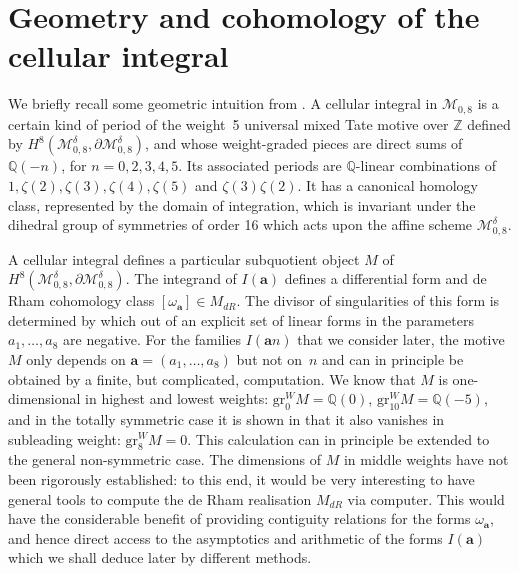 \documentclass[12pt,reqno]{amsart}
\theoremstyle{remark}
\newcommand\ba{\boldsymbol a}
\newcommand{\wadimnote}[1]{{\color{blue} Wadim: #1}}
\begin{document}
\section{Geometry and cohomology of the cellular integral}
\label{secgeom}
We briefly recall some geometric intuition from \cite{Br16}. A  cellular integral in $\mathcal{M}_{0,8}$ is a certain kind of period of the weight~5 universal mixed Tate motive over $\mathbb{Z}$ defined by   
$H^8( \mathcal{M}_{0,8}^{\delta}, \partial \mathcal{M}_{0,8}^{\delta} )$, and whose weight-graded pieces are direct sums of  $\mathbb{Q}(-n)$,
for $n=0,2,3,4,5$.  Its associated periods are $\mathbb{Q}$-linear combinations of $1,\zeta(2), \zeta(3), \zeta(4), \zeta(5)$ and $\zeta(3)\zeta(2)$. It has a canonical homology class, represented by the domain of integration,  which is invariant under the dihedral group of symmetries of order 16 which acts upon the affine scheme $\mathcal{M}_{0,8}^{\delta}. $

A cellular integral defines a particular subquotient  object $M$ of $ H^8( \mathcal{M}_{0,8}^{\delta}, \partial \mathcal{M}_{0,8}^{\delta} )$.
The integrand of $I(\ba)$ defines a   differential form  and de Rham cohomology class $[\omega_{\ba}] \in M_{dR}$. The divisor of singularities of this form is determined by which out of an  explicit set of  linear forms in the parameters $a_1,\ldots, a_8$ are negative.
For the  families $I(\ba n)$ that we consider later, the motive $M$ only depends on $\ba=(a_1,\ldots,a_8)$ but not on~$n$
and can in principle be obtained by a finite, but complicated, computation. We know that $M$  is one-dimensional in highest and lowest weights: $\mathrm{gr}^W_0 M = \mathbb{Q}(0)$, $\mathrm{gr}^W_{10} M = \mathbb{Q}(-5)$, and in the totally symmetric case it is shown in \cite{Br16} that it also vanishes in subleading weight: $\mathrm{gr}^W_8 M =0$.  This calculation can in principle 
be extended to the general non-symmetric case. The dimensions of $M$ in middle weights  have not been rigorously established: to this end, it would be very interesting to have general tools to compute the de Rham realisation $M_{dR}$ via computer. This would  have the considerable benefit of  providing  contiguity relations for the forms $\omega_{\ba}$, and hence direct access to the asymptotics and arithmetic of the forms $I(\ba)$ which we shall deduce later by different methods. 
\end{document}
